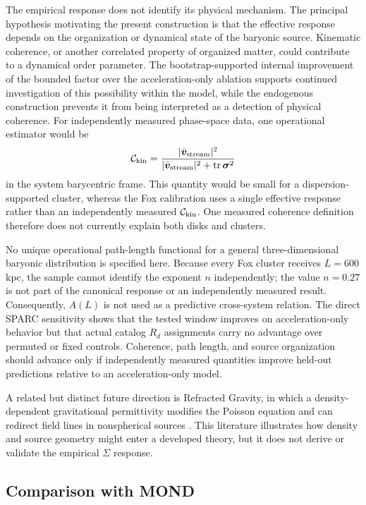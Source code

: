 \documentclass[aps,prd,reprint,superscriptaddress,showpacs,floatfix,longbibliography]{revtex4-2}
\begin{document}
The empirical response does not identify its physical mechanism. The principal hypothesis motivating the present construction is that the effective response depends on the organization or dynamical state of the baryonic source. Kinematic coherence, or another correlated property of organized matter, could contribute to a dynamical order parameter. The bootstrap-supported internal improvement of the bounded factor over the acceleration-only ablation supports continued investigation of this possibility within the model, while the endogenous construction prevents it from being interpreted as a detection of physical coherence. For independently measured phase-space data, one operational estimator would be
\begin{equation}
\mathcal C_{\rm kin}=
\frac{|\bar{\bm v}_{\rm stream}|^2}
{|\bar{\bm v}_{\rm stream}|^2+
{\rm tr}\,\bm{\sigma}^2}
\label{eq:ckin}
\end{equation}
in the system barycentric frame. This quantity would be small for a dispersion-supported cluster, whereas the Fox calibration uses a single effective response rather than an independently measured $\mathcal C_{\rm kin}$. One measured coherence definition therefore does not currently explain both disks and clusters.

No unique operational path-length functional for a general three-dimensional baryonic distribution is specified here. Because every Fox cluster receives $L=600$ kpc, the sample cannot identify the exponent $n$ independently; the value $n=0.27$ is not part of the canonical response or an independently measured result. Consequently, $A(L)$ is not used as a predictive cross-system relation. The direct SPARC sensitivity shows that the tested window improves on acceleration-only behavior but that actual catalog $R_d$ assignments carry no advantage over permuted or fixed controls. Coherence, path length, and source organization should advance only if independently measured quantities improve held-out predictions relative to an acceleration-only model.

A related but distinct future direction is Refracted Gravity, in which a density-dependent gravitational permittivity modifies the Poisson equation and can redirect field lines in nonspherical sources \cite{ref12,ref13,ref14}. This literature illustrates how density and source geometry might enter a developed theory, but it does not derive or validate the empirical $\Sigma$ response.

\subsection{Comparison with MOND}
\end{document}
